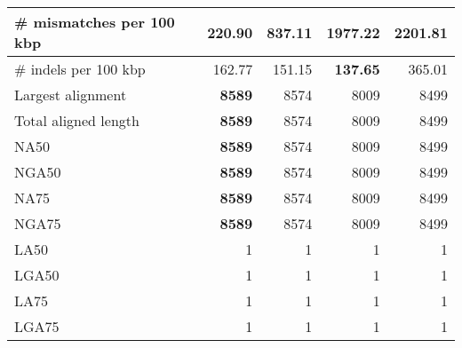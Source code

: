 \documentclass[12pt,a4paper]{article}
\begin{document}
\begin{table}[ht]
\begin{center}
\begin{tabular}{|l*{4}{|r}|}
\# mismatches per 100 kbp & {\bf 220.90} & 837.11 & 1977.22 & 2201.81 \\ \hline
\# indels per 100 kbp & 162.77 & 151.15 & {\bf 137.65} & 365.01 \\ \hline
Largest alignment & {\bf 8589} & 8574 & 8009 & 8499 \\ \hline
Total aligned length & {\bf 8589} & 8574 & 8009 & 8499 \\ \hline
NA50 & {\bf 8589} & 8574 & 8009 & 8499 \\ \hline
NGA50 & {\bf 8589} & 8574 & 8009 & 8499 \\ \hline
NA75 & {\bf 8589} & 8574 & 8009 & 8499 \\ \hline
NGA75 & {\bf 8589} & 8574 & 8009 & 8499 \\ \hline
LA50 & 1 & 1 & 1 & 1 \\ \hline
LGA50 & 1 & 1 & 1 & 1 \\ \hline
LA75 & 1 & 1 & 1 & 1 \\ \hline
LGA75 & 1 & 1 & 1 & 1 \\ \hline
\end{tabular}
\end{center}
\end{table}
\end{document}
